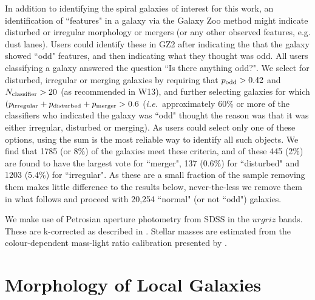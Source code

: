 \documentclass[usenatbib]{mn2e}
\newcommand{\ie}{{\it i.e.}}
\begin{document}
In addition to identifying the spiral galaxies of interest for this work, an identification of ``features" in a galaxy via the Galaxy Zoo method might indicate disturbed or irregular morphology or mergers (or any other observed features, e.g. dust lanes). Users could identify these in GZ2 after indicating the that the galaxy showed ``odd" features, and then indicating what they thought was odd. All users classifying a galaxy answered the question ``Is there anything odd?". We select for disturbed, irregular or merging galaxies by requiring that $p_{\rm odd} > 0.42$ and $N_{\rm classifier}>20$ (as recommended in W13), and further selecting galaxies for which $(p_{\rm irregular}+p_{\rm disturbed} + p_{\rm merger} > 0.6$ (\ie ~approximately 60\% or more of the classifiers who indicated the galaxy was ``odd" thought the reason was that it was either irregular, disturbed or merging). As users could select only one of these options, using the sum is the most reliable way to identify all such objects. We find that 1785 (or 8\%) of  the galaxies meet these criteria, and of these 445 (2\%) are found to have the largest vote for ``merger", 137 (0.6\%)  for ``disturbed" and 1203 (5.4\%) for ``irregular". As these are a small fraction of the sample removing them makes little difference to the results below, never-the-less we remove them in what follows and proceed with 20,254 ``normal" (or not ``odd") galaxies. 

We make use of Petrosian aperture photometry from SDSS in the $urgriz$ bands. These are k-corrected as described in \citet{Bamford2009}. Stellar masses are estimated from the colour-dependent mass-light ratio calibration presented by \citet{Baldry2008}. 

\section{Morphology of Local Galaxies} \label{demographics}
\end{document}

